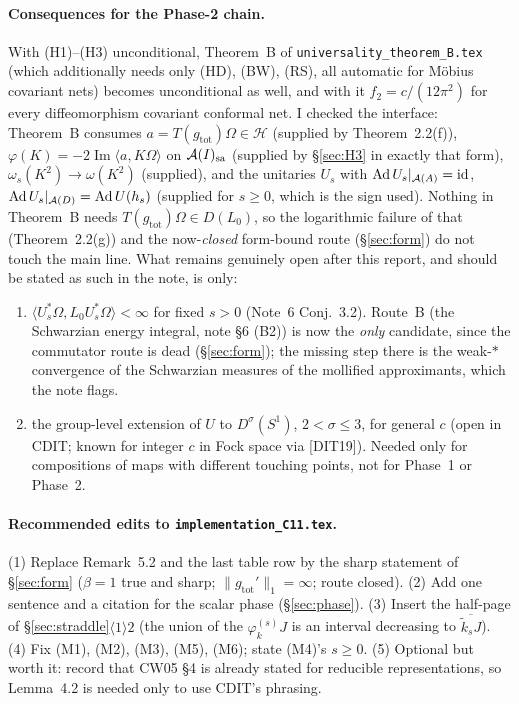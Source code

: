 \documentclass[11pt]{article}
\newcommand{\Om}{\Omega}
\newcommand{\Hil}{\mathcal H}
\newcommand{\ipp}[2]{\langle #1,#2\rangle}
\newcommand{\nrm}[1]{\lVert #1\rVert}
\newcommand{\gtot}{g_{\mathrm{tot}}}
\newcommand{\ktil}{\widetilde k}
\newcommand{\Ad}{\operatorname{Ad}}
\begin{document}
\paragraph{Consequences for the Phase-2 chain.}  With (H1)--(H3) unconditional, Theorem~B of
\texttt{universality\_theorem\_B.tex} (which additionally needs only (HD), (BW), (RS), all automatic for
M\"obius covariant nets) becomes unconditional as well, and with it $f_2=c/(12\pi^2)$ for every diffeomorphism
covariant conformal net.  I checked the interface: Theorem~B consumes $a=T(\gtot)\Om\in\Hil$ (supplied by
Theorem~2.2(f)), $\varphi(K)=-2\operatorname{Im}\ipp a{K\Om}$ on $\mathcal A(I)_{\mathrm{sa}}$ (supplied by
\S\ref{sec:H3} in exactly that form), $\omega_s(K^2)\to\omega(K^2)$ (supplied), and the unitaries $U_s$ with
$\Ad U_s|_{\cA(A)}=\mathrm{id}$, $\Ad U_s|_{\cA(D)}=\Ad U(h_s)$ (supplied for $s\ge0$, which is the sign used).
Nothing in Theorem~B needs $T(\gtot)\Om\in D(L_0)$, so the logarithmic failure of that (Theorem~2.2(g)) and the
now-\emph{closed} form-bound route (\S\ref{sec:form}) do not touch the main line.  What remains genuinely open
after this report, and should be stated as such in the note, is only:
\begin{enumerate}[leftmargin=1.6em,label=\textup{(O\arabic*)}]
\item $\ipp{U_s^*\Om}{L_0U_s^*\Om}<\infty$ for fixed $s>0$ (Note~6 Conj.~3.2).  Route~B (the Schwarzian energy
      integral, note \S6 (B2)) is now the \emph{only} candidate, since the commutator route is dead
      (\S\ref{sec:form}); the missing step there is the weak-$*$ convergence of the Schwarzian measures of the
      mollified approximants, which the note flags.
\item the group-level extension of $U$ to $D^\sigma(S^1)$, $2<\sigma\le3$, for general $c$ (open in CDIT;
      known for integer $c$ in Fock space via [DIT19]).  Needed only for compositions of maps with different
      touching points, not for Phase~1 or Phase~2.
\end{enumerate}

\paragraph{Recommended edits to \texttt{implementation\_C11.tex}.}
(1) Replace Remark~5.2 and the last table row by the sharp statement of \S\ref{sec:form}
($\beta=1$ true and sharp; $\nrm{\gtot'}_1=\infty$; route closed).
(2) Add one sentence and a citation for the scalar phase (\S\ref{sec:phase}).
(3) Insert the half-page of \S\ref{sec:straddle}$\langle1\rangle2$ (the union of the $\varphi^{(s)}_kJ$ is an
interval decreasing to $\overline{\ktil_sJ}$).
(4) Fix (M1), (M2), (M3), (M5), (M6); state (M4)'s $s\ge0$.
(5) Optional but worth it: record that CW05 \S4 is already stated for reducible representations, so Lemma~4.2 is
needed only to use CDIT's phrasing.
\end{document}
